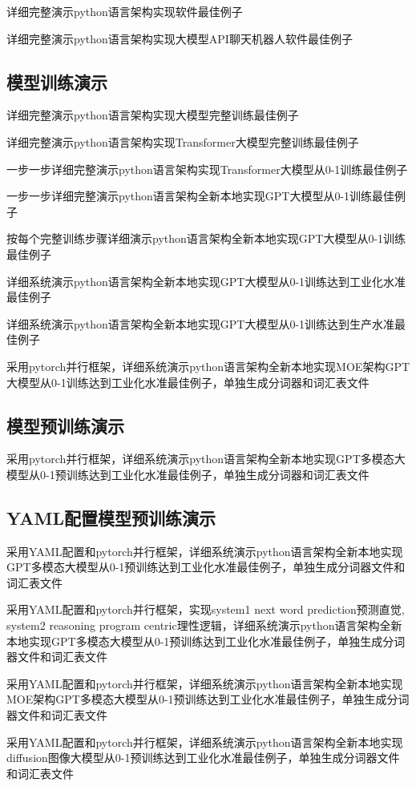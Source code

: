 \documentclass[12pt]{book}
\begin{document}
详细完整演示python语言架构实现软件最佳例子

详细完整演示python语言架构实现大模型API聊天机器人软件最佳例子


\subsection{模型训练演示}
详细完整演示python语言架构实现大模型完整训练最佳例子

详细完整演示python语言架构实现Transformer大模型完整训练最佳例子

一步一步详细完整演示python语言架构实现Transformer大模型从0-1训练最佳例子

一步一步详细完整演示python语言架构全新本地实现GPT大模型从0-1训练最佳例子

按每个完整训练步骤详细演示python语言架构全新本地实现GPT大模型从0-1训练最佳例子

详细系统演示python语言架构全新本地实现GPT大模型从0-1训练达到工业化水准最佳例子

详细系统演示python语言架构全新本地实现GPT大模型从0-1训练达到生产水准最佳例子

采用pytorch并行框架，详细系统演示python语言架构全新本地实现MOE架构GPT大模型从0-1训练达到工业化水准最佳例子，单独生成分词器和词汇表文件

\subsection{模型预训练演示}
采用pytorch并行框架，详细系统演示python语言架构全新本地实现GPT多模态大模型从0-1预训练达到工业化水准最佳例子，单独生成分词器和词汇表文件

\subsection{YAML配置模型预训练演示}
采用YAML配置和pytorch并行框架，详细系统演示python语言架构全新本地实现GPT多模态大模型从0-1预训练达到工业化水准最佳例子，单独生成分词器文件和词汇表文件

采用YAML配置和pytorch并行框架，实现system1 next word prediction预测直觉, system2  reasoning  program centric理性逻辑，详细系统演示python语言架构全新本地实现GPT多模态大模型从0-1预训练达到工业化水准最佳例子，单独生成分词器文件和词汇表文件

采用YAML配置和pytorch并行框架，详细系统演示python语言架构全新本地实现MOE架构GPT多模态大模型从0-1预训练达到工业化水准最佳例子，单独生成分词器文件和词汇表文件


采用YAML配置和pytorch并行框架，详细系统演示python语言架构全新本地实现diffusion图像大模型从0-1预训练达到工业化水准最佳例子，单独生成分词器文件和词汇表文件
\end{document}
